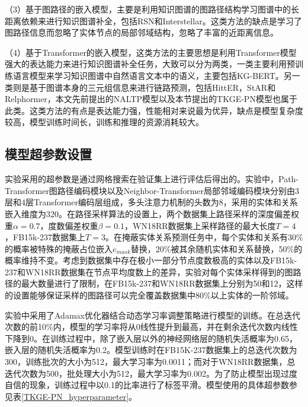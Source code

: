 （3）基于图路径的嵌入模型，主要是利用知识图谱的图路径结构学习图谱中的长距离依赖来进行知识图谱补全，包括RSN和Interstellar。这类方法的缺点是学习了图路径信息而忽略了实体节点的局部邻域结构，忽略了丰富的近距离信息。

（4）基于Transformer的嵌入模型，这类方法的主要思想是利用Transformer模型强大的表达能力来进行知识图谱补全任务，大致可以分为两类，一类主要利用预训练语言模型来学习知识图谱中自然语言文本中的语义，主要包括KG-BERT。另一类则是基于图谱本身的三元组信息来进行链路预测，包括HittER，StAR和Relphormer，本文先前提出的NALTP模型以及本节提出的TKGE-PN模型也属于此类。这类方法的有点是表达能力强，性能相对来说最为优异，缺点是模型复杂度较高，模型训练时间长，训练和推理的资源消耗较大。

\subsection{模型超参数设置}

实验采用的超参数是通过网格搜索在验证集上进行评估后得出的。实验中，Path-Transformer图路径编码模块以及Neighbor-Transformer局部邻域编码模块分别由3层和4层Transformer编码层组成，多头注意力机制的头数为8，采用的实体和关系嵌入维度为320。在路径采样算法的设置上，两个数据集上路径采样的深度偏差权重$\alpha = 0.7$，度数偏差权重$\beta=0.1$，WN18RR数据集上采样路径的最大长度$T=4$，FB15k-237数据集上$T=3$。在掩蔽实体关系预测任务中，每个实体和关系有30\%的概率被特殊的掩蔽占位嵌入$e_{mask}$替换，20\%被其余随机实体和关系替换，50\%的概率维持不变。考虑到数据集中存在极小一部分节点度数极高的实体以及FB15k-237和WN18RR数据集在节点平均度数上的差异，实验对每个实体采样得到的图路径的最大数量进行了限制，在FB15k-237和WN18RR数据集上分别为50和12，这样的设置能够保证采样的图路径可以完全覆盖数据集中80\%以上实体的一阶邻域。

实验中采用了Adamax优化器结合动态学习率调整策略进行模型的训练。在总迭代次数的前10\%内，模型的学习率将从0线性提升到最高，并在剩余迭代次数内线性下降到0。在训练过程中，除了嵌入层以外的神经网络层的随机失活概率为0.65，嵌入层的随机失活概率为0.2。模型训练时在FB15K-237数据集上的总迭代次数为300，训练批次的大小为512，最大学习率为0.0011；而对于WN18RR数据集，总迭代次数为500，批处理大小为512，最大学习率为0.002。为了防止模型出现过度自信的现象，训练过程中以0.1的比率进行了标签平滑。模型使用的具体超参数参见表\ref{TKGE-PN_hyperparameter}。

